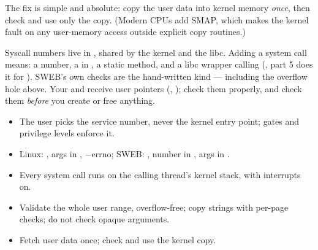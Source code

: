 The fix is simple and absolute: copy the user data into kernel memory
\emph{once}, then check and use only the copy. (Modern CPUs add SMAP, which
makes the kernel fault on any user-memory access outside explicit
copy routines.)

\begin{swebbox}
Syscall numbers live in ,
shared by the kernel and the libc. Adding a system call means: a number,
a  in , a static
 method, and a libc wrapper calling 
(, part 5 does it for ). SWEB's own checks are
the hand-written  kind --- including the
overflow hole above. Your  and 
receive user pointers (, ); check them
properly, and check them \emph{before} you create or free anything.
\end{swebbox}

\begin{keybox}
\begin{itemize}
  \item The user picks the service number, never the kernel entry point;
    gates and privilege levels enforce it.
  \item Linux: , args in ,
    $-$errno; SWEB: , number in , args in
    .
  \item Every system call runs on the calling thread's kernel stack, with
    interrupts on.
  \item Validate the whole user range, overflow-free; copy strings with
    per-page checks; do not check opaque arguments.
  \item Fetch user data once; check and use the kernel copy.
\end{itemize}
\end{keybox}
